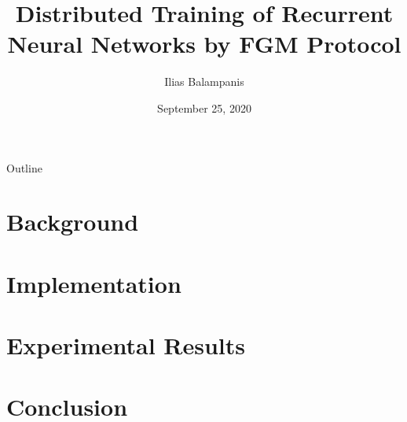 \documentclass{beamer}
\title[Diploma Thesis Presentation]{Distributed Training of Recurrent Neural Networks by FGM Protocol}
\author{Ilias Balampanis}
\institute[TUC]{ %
School of Electrical and Computer Engineering \\
Technical University of Crete}
\date{September 25, 2020}
\begin{document}
    \begin{frame}
        \titlepage
    \end{frame}

    \begin{frame}{Outline}
        \tableofcontents
    \end{frame}

    \section{Background}\label{sec:background}
    

    \section{Implementation}\label{sec:implementation}
    

    \section{Experimental Results}\label{sec:experimental-results}
    

    \section{Conclusion}\label{sec:conclusion}
    
\end{document}
